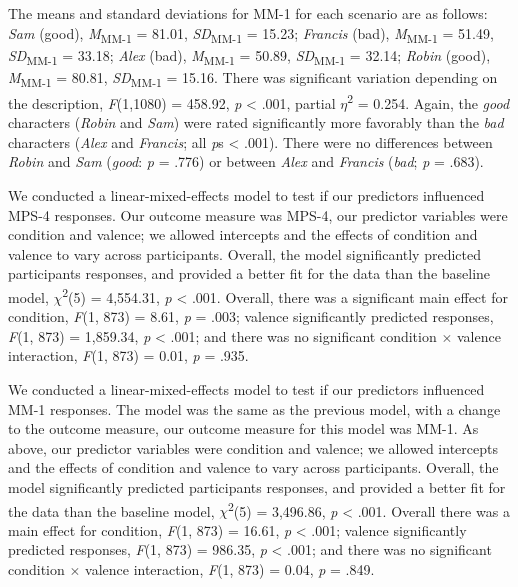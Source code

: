 \documentclass[
  man,floatsintext]{apa6}
\begin{document}
The means and standard deviations for MM-1 for each scenario are as follows:
\emph{Sam} (good),
\emph{M}\textsubscript{MM-1} = 81.01, \emph{SD}\textsubscript{MM-1} = 15.23;
\emph{Francis} (bad),
\emph{M}\textsubscript{MM-1} = 51.49, \emph{SD}\textsubscript{MM-1} = 33.18;
\emph{Alex} (bad),
\emph{M}\textsubscript{MM-1} = 50.89, \emph{SD}\textsubscript{MM-1} = 32.14;
\emph{Robin} (good),
\emph{M}\textsubscript{MM-1} = 80.81, \emph{SD}\textsubscript{MM-1} = 15.16. There was significant variation depending on the description, \emph{F}(1,1080) = 458.92, \emph{p} \textless{} .001, partial \(\eta\)\textsuperscript{2} = 0.254. Again, the \emph{good} characters (\emph{Robin} and \emph{Sam}) were rated significantly more favorably than the \emph{bad} characters (\emph{Alex} and \emph{Francis}; all \emph{p}s \textless{} .001). There were no differences between \emph{Robin} and \emph{Sam} (\emph{good}: \emph{p} = .776) or between \emph{Alex} and \emph{Francis} (\emph{bad}; \emph{p} = .683).

We conducted a linear-mixed-effects model to test if our predictors influenced MPS-4 responses. Our outcome measure was MPS-4, our predictor variables were condition and valence; we allowed intercepts and the effects of condition and valence to vary across participants.
Overall, the model significantly predicted participants responses, and provided a better fit for the data than the baseline model,
\(\chi\)\textsuperscript{2}(5) = 4,554.31, \emph{p} \textless{} .001.
Overall, there was a significant main effect for condition,
\emph{F}(1, 873) = 8.61, \emph{p} = .003;
valence significantly predicted responses,
\emph{F}(1, 873) = 1,859.34, \emph{p} \textless{} .001;
and there was no significant condition \(\times\) valence interaction,
\emph{F}(1, 873) = 0.01, \emph{p} = .935.

We conducted a linear-mixed-effects model to test if our predictors influenced MM-1 responses. The model was the same as the previous model, with a change to the outcome measure, our outcome measure for this model was MM-1. As above, our predictor variables were condition and valence; we allowed intercepts and the effects of condition and valence to vary across participants.
Overall, the model significantly predicted participants responses, and provided a better fit for the data than the baseline model,
\(\chi\)\textsuperscript{2}(5) = 3,496.86, \emph{p} \textless{} .001.
Overall there was a main effect for condition,
\emph{F}(1, 873) = 16.61, \emph{p} \textless{} .001;
valence significantly predicted responses,
\emph{F}(1, 873) = 986.35, \emph{p} \textless{} .001;
and there was no significant condition \(\times\) valence interaction,
\emph{F}(1, 873) = 0.04, \emph{p} = .849.
\end{document}
